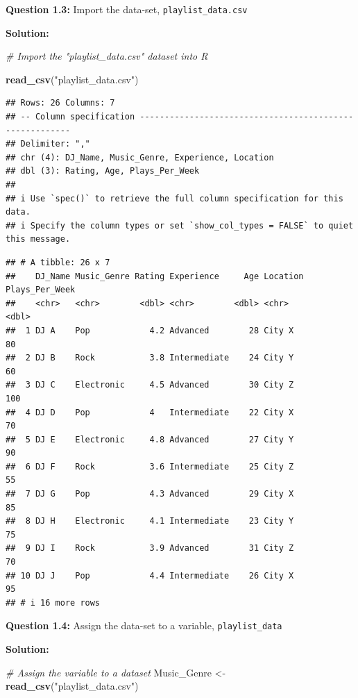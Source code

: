 \documentclass[
]{article}
\newenvironment{Shaded}{\begin{snugshade}}{\end{snugshade}}
\newcommand{\CommentTok}[1]{\textcolor[rgb]{0.56,0.35,0.01}{\textit{#1}}}
\newcommand{\FunctionTok}[1]{\textcolor[rgb]{0.13,0.29,0.53}{\textbf{#1}}}
\newcommand{\NormalTok}[1]{#1}
\newcommand{\OtherTok}[1]{\textcolor[rgb]{0.56,0.35,0.01}{#1}}
\newcommand{\StringTok}[1]{\textcolor[rgb]{0.31,0.60,0.02}{#1}}
\begin{document}
\textbf{Question 1.3:} Import the data-set, \texttt{playlist\_data.csv}

\textbf{Solution:}

\begin{Shaded}
\begin{Highlighting}[]
\CommentTok{\# Import the "playlist\_data.csv" dataset into R }

\FunctionTok{read\_csv}\NormalTok{(}\StringTok{"playlist\_data.csv"}\NormalTok{) }
\end{Highlighting}
\end{Shaded}

\begin{verbatim}
## Rows: 26 Columns: 7
## -- Column specification --------------------------------------------------------
## Delimiter: ","
## chr (4): DJ_Name, Music_Genre, Experience, Location
## dbl (3): Rating, Age, Plays_Per_Week
## 
## i Use `spec()` to retrieve the full column specification for this data.
## i Specify the column types or set `show_col_types = FALSE` to quiet this message.
\end{verbatim}

\begin{verbatim}
## # A tibble: 26 x 7
##    DJ_Name Music_Genre Rating Experience     Age Location Plays_Per_Week
##    <chr>   <chr>        <dbl> <chr>        <dbl> <chr>             <dbl>
##  1 DJ A    Pop            4.2 Advanced        28 City X               80
##  2 DJ B    Rock           3.8 Intermediate    24 City Y               60
##  3 DJ C    Electronic     4.5 Advanced        30 City Z              100
##  4 DJ D    Pop            4   Intermediate    22 City X               70
##  5 DJ E    Electronic     4.8 Advanced        27 City Y               90
##  6 DJ F    Rock           3.6 Intermediate    25 City Z               55
##  7 DJ G    Pop            4.3 Advanced        29 City X               85
##  8 DJ H    Electronic     4.1 Intermediate    23 City Y               75
##  9 DJ I    Rock           3.9 Advanced        31 City Z               70
## 10 DJ J    Pop            4.4 Intermediate    26 City X               95
## # i 16 more rows
\end{verbatim}

\textbf{Question 1.4:} Assign the data-set to a variable,
\texttt{playlist\_data}

\textbf{Solution:}

\begin{Shaded}
\begin{Highlighting}[]
\CommentTok{\# Assign the variable to a dataset }
\NormalTok{Music\_Genre }\OtherTok{\textless{}{-}} \FunctionTok{read\_csv}\NormalTok{(}\StringTok{"playlist\_data.csv"}\NormalTok{)}
\end{Highlighting}
\end{Shaded}
\end{document}
